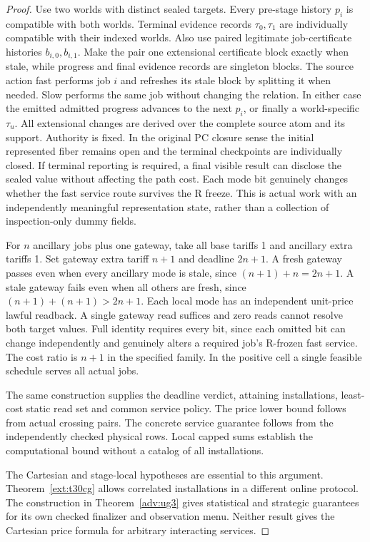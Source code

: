 \begin{proof}
Use two worlds with distinct sealed targets. Every pre-stage history \(p_i\) is compatible with both worlds. Terminal evidence records \(\tau_0,\tau_1\) are individually compatible with their indexed worlds. Also use paired legitimate job-certificate histories \(b_{i,0},b_{i,1}\). Make the pair one extensional certificate block exactly when stale, while progress and final evidence records are singleton blocks. The source action fast performs job \(i\) and refreshes its stale block by splitting it when needed. Slow performs the same job without changing the relation. In either case the emitted admitted progress advances to the next \(p_i\), or finally a world-specific \(\tau_u\). All extensional changes are derived over the complete source atom and its support. Authority is fixed. In the original PC closure sense the initial represented fiber remains open and the terminal checkpoints are individually closed. If terminal reporting is required, a final visible result can disclose the sealed value without affecting the path cost. Each mode bit genuinely changes whether the fast service route survives the R freeze. This is actual work with an independently meaningful representation state, rather than a collection of inspection-only dummy fields.

For \(n\) ancillary jobs plus one gateway, take all base tariffs 1 and ancillary extra tariffs 1. Set gateway extra tariff \(n+1\) and deadline \(2n+1\). A fresh gateway passes even when every ancillary mode is stale, since \((n+1)+n=2n+1\). A stale gateway fails even when all others are fresh, since \((n+1)+(n+1)>2n+1\). Each local mode has an independent unit-price lawful readback. A single gateway read suffices and zero reads cannot resolve both target values. Full identity requires every bit, since each omitted bit can change independently and genuinely alters a required job's R-frozen fast service. The cost ratio is \(n+1\) in the specified family. In the positive cell a single feasible schedule serves all actual jobs.

The same construction supplies the deadline verdict, attaining installations, least-cost static read set and common service policy. The price lower bound follows from actual crossing pairs. The concrete service guarantee follows from the independently checked physical rows. Local capped sums establish the computational bound without a catalog of all installations.

The Cartesian and stage-local hypotheses are essential to this argument. Theorem~\ref{ext:t30cg} allows correlated installations in a different online protocol. The construction in Theorem~\ref{adv:ug3} gives statistical and strategic guarantees for its own checked finalizer and observation menu. Neither result gives the Cartesian price formula for arbitrary interacting services.

\end{proof}

